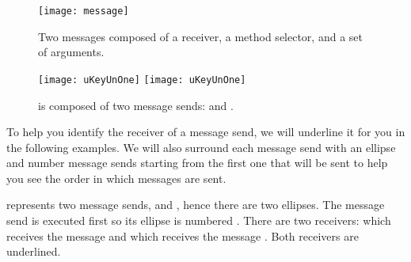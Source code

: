 \documentclass[a4paper,10pt,twoside]{book}
\begin{document}
\begin{figure}[htb]
\begin{minipage}[t]{0.53\textwidth}
	\begin{center}
	\texttt{[image: message]}
	\caption{Two messages composed of a receiver, a method selector, and a set of arguments.\label{fig:firstScriptMessage}}\end{center}
\end{minipage}
\hfill
\begin{minipage}[t]{0.43\textwidth}
	\begin{center}
	\ifluluelse
		{\texttt{[image: uKeyUnOne]}}
		{\texttt{[image: uKeyUnOne]}}
	\caption{ is composed of two message sends:  and .\label{fig:ellipse}}
	\end{center}
\end{minipage}
\end{figure}



To help you identify the receiver of a message send, we will underline it for you in the following examples.
We will also surround each message send with an ellipse and number message sends starting from the first one that will be sent to help you see the order in which messages are sent.


 represents two message sends,  and , hence there are two ellipses.
The message send  is executed first so its ellipse is numbered .
There are two receivers:  which receives the message  and  which receives the message .
Both receivers are underlined.
\end{document}
